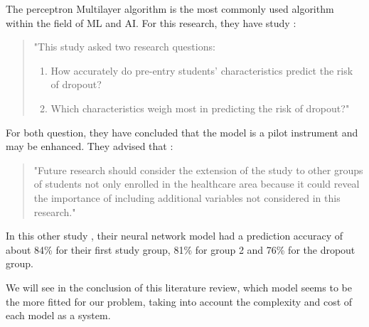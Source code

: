 \documentclass[../../../main.tex]{subfiles}
\begin{document}
The perceptron Multilayer algorithm is the most commonly used algorithm within the field of ML and AI.\cite{siri_predicting_2015} For this research, they have study :
\begin{quote}
    "This study asked two research questions: 
    \begin{enumerate}
        \item How accurately do pre-entry students’ characteristics predict the risk of dropout?
        \item Which characteristics weigh most in predicting the risk of dropout?"
    \end{enumerate} 
\end{quote}\cite{siri_predicting_2015}
For both question, they have concluded that the model is a pilot instrument and may be enhanced. They advised that :
\begin{quote}
    "Future research should consider the extension of the study to other groups of students not only enrolled in the healthcare area because it could reveal the importance of including additional variables not considered in this research."
\end{quote}\cite{siri_predicting_2015}

In this other study \cite{siri_predicting_2015}, their neural network model had a prediction accuracy of about 84\% for their first study group, 81\% for group 2 and 76\% for the dropout group. 

We will see in the conclusion of this literature review, which model seems to be the more fitted for our problem, taking into account the complexity and cost of each model as a system.
\end{document}
